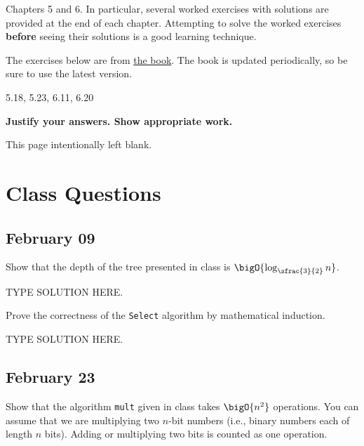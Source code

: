 \documentclass[final]{article}
\begin{document}
\begin{titlepage}
    \begin{tcolorbox}[title=Reading,fonttitle=\bfseries]
        Chapters 5 and 6. In particular, several worked exercises with solutions are provided at the end of each chapter. Attempting to solve the worked exercises \textbf{before} seeing their solutions is a good learning technique.
    \end{tcolorbox}
    The exercises below are from \href{https://sites.google.com/site/gopalpandurangan/home/algorithms-course}{the book}. The book is updated periodically, so be sure to use the latest version.

    \begin{tcolorbox}[title=Exercises,fonttitle=\bfseries]
        5.18, 5.23, 6.11, 6.20
    \end{tcolorbox}

    \textbf{Justify your answers. Show appropriate work.}
\end{titlepage}
\vspace*{\fill}\begin{center}{\Huge This page intentionally left blank.}\end{center}\vspace*{\fill}\thispagestyle{empty}\clearpage
{}

\section{Class Questions}
\subsection{February 09}

\begin{question}
    Show that the depth of the tree presented in class is $\bigO{\log_{\sfrac{3}{2}}n}$.
\end{question}

\begin{solution}
    TYPE SOLUTION HERE.
\end{solution}

\begin{question}
    Prove the correctness of the \texttt{Select} algorithm by mathematical induction.
\end{question}

\begin{solution}
    TYPE SOLUTION HERE.
\end{solution}

\subsection{February 23}
\begin{question}
    Show that the algorithm \texttt{mult} given in class takes $\bigO{n^2}$ operations. You can assume
    that we are multiplying two $n$-bit numbers (i.e., binary numbers each of length $n$  bits). Adding or multiplying two bits is counted as one operation.

\end{question}
\end{document}
